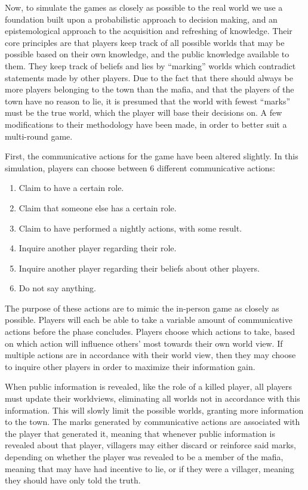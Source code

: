 Now, to simulate the games as closely as possible to the real world we use a
foundation built upon a probabilistic approach to decision making, and an
epistemological approach to the acquisition and refreshing of
knowledge\cite{commitment}. Their core principles are that players keep track
of all possible worlds that may be possible based on their own knowledge, and
the public knowledge available to them. They keep track of beliefs and lies by
“marking” worlds which contradict statements made by other players. Due to the
fact that there should always be more players belonging to the town than the
mafia, and that the players of the town have no reason to lie, it is presumed
that the world with fewest “marks” must be the true world, which the player
will base their decisions on. A few modifications to their methodology have
been made, in order to better suit a multi-round game.

First, the communicative actions for the game have been altered slightly. In
this simulation, players can choose between 6 different communicative actions:
\begin{enumerate}
	\item Claim to have a certain role.
	\item Claim that someone else has a certain role.
	\item Claim to have performed a nightly actions, with some result.
	\item Inquire another player regarding their role.
	\item Inquire another player regarding their beliefs about other players.
	\item Do not say anything.
\end{enumerate}
The purpose of these actions are to mimic the in-person game as closely as
possible. Players will each be able to take a variable amount of communicative actions before the
phase concludes. Players choose which actions to take, based on which action
will influence others’ most towards their own world view. If multiple actions
are in accordance with their world view, then they may choose to inquire other
players in order to maximize their information gain.

When public information is revealed, like the role of a killed player, all
players must update their worldviews, eliminating all worlds not in accordance
with this information. This will slowly limit the possible worlds, granting
more information to the town. The marks generated by communicative actions are
associated with the player that generated it, meaning that whenever public
information is revealed about that player, villagers may either discard or
reinforce said marks, depending on whether the player was revealed to be a
member of the mafia, meaning that may have had incentive to lie, or if they
were a villager, meaning they should have only told the truth.

